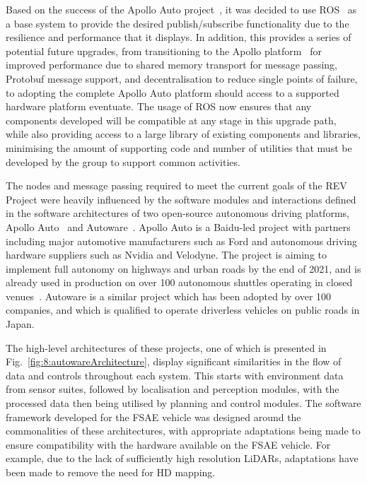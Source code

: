 Based on the success of the Apollo Auto project~\cite{baidu_apollo_nodate}, it was decided to use ROS~\cite{open_source_robotics_foundation_ros/introduction_nodate} as a base system to provide the desired publish/subscribe functionality due to the resilience and performance that it displays.
In addition, this provides a series of potential future upgrades, from transitioning to the Apollo platform~\cite{apollo_auto_collections_2019} for improved performance due to shared memory transport for message passing, Protobuf message support, and decentralisation to reduce single points of failure, to adopting the complete Apollo Auto platform should access to a supported hardware platform eventuate.
The usage of ROS now ensures that any components developed will be compatible at any stage in this upgrade path, while also providing access to a large library of existing components and libraries, minimising the amount of supporting code and number of utilities that must be developed by the group to support common activities.

The nodes and message passing required to meet the current goals of the REV Project were heavily influenced by the software modules and interactions defined in the software architectures of two open-source autonomous driving platforms, Apollo Auto~\cite{baidu_apollo_nodate} and Autoware~\cite {autoware_autoware_nodate}.
Apollo Auto is a Baidu-led project with partners including major automotive manufacturers such as Ford and autonomous driving hardware suppliers such as Nvidia and Velodyne.
The project is aiming to implement full autonomy on highways and urban roads by the end of 2021, and is already used in production on over 100 autonomous shuttles operating in closed venues~\cite{noauthor_self-drive_2018}.
Autoware is a similar project which has been adopted by over 100 companies, and which is qualified to operate driverless vehicles on public roads in Japan.

The high-level architectures of these projects, one of which is presented in Fig.~\ref{fig:8:autowareArchitecture}, display significant similarities in the flow of data and controls throughout each system.
This starts with environment data from sensor suites, followed by localisation and perception modules, with the processed data then being utilised by planning and control modules.
The software framework developed for the FSAE vehicle was designed around the commonalities of these architectures, with appropriate adaptations being made to ensure compatibility with the hardware available on the FSAE vehicle.
For example, due to the lack of sufficiently high resolution LiDARs, adaptations have been made to remove the need for HD mapping.

